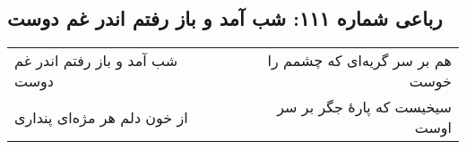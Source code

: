 \begin{center}
\section*{رباعی شماره ۱۱۱: شب آمد و باز رفتم اندر غم دوست}
\label{sec:sh111}
\begin{longtable}{l p{0.5cm} r}
شب آمد و باز رفتم اندر غم دوست
&&
هم بر سر گریه‌ای که چشمم را خوست
\\
از خون دلم هر مژه‌ای پنداری
&&
سیخیست که پارهٔ جگر بر سر اوست
\\
\end{longtable}
\end{center}
